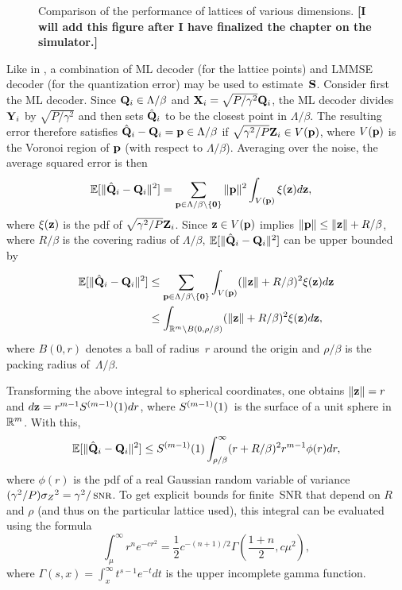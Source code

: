 \begin{figure}
  \begin{center}
  \end{center}
  \caption{Comparison of the performance of lattices of various dimensions.
  \textbf{[I will add this figure after I have finalized the chapter on the
  simulator.]}}
  \label{fig:sim_latticeperf}
\end{figure}

Like in , a combination of ML decoder (for the lattice
points) and LMMSE decoder (for the quantization error) may be used to
estimate~$\S$.  Consider first the ML decoder. Since $\Q_i \in \Lambda/\beta$
and $\X_i = \sqrt{P/\gamma^2} \Q_i$, the ML decoder divides $\Y_i$ by
$\sqrt{P/\gamma^2}$ and then sets $\Qhv_i$ to be the closest point in
$\Lambda/\beta$. The resulting error therefore satisfies $\Qhv_i - \Q_i = \p \in
\Lambda/\beta$ if $\sqrt{\gamma^2/P} \Zv_i \in V(\p)$, where $V(\p)$ is the
Voronoi region of $\p$ (with respect to $\Lambda/\beta$). Averaging over the
noise, the average squared error is then
\begin{align*}
  \mseqiv &= \sum_{\p \in \Lambda/\beta \setminus \{\vz\}} \| \p \|^2
  \int_{V(\p)} \xi(\z) d\z,
\end{align*}
where $\xi(\z)$ is the pdf of $\sqrt{\gamma^2/P} \Zv_i$.
Since $\z \in V(\p)$ implies $\|\p\| \le \|\z\| + R/\beta$, where $R/\beta$ is
the covering radius of $\Lambda/\beta$, $\mseqiv$ can be upper bounded by
\begin{align*}
  \mseqiv &\le \sum_{\p \in \Lambda/\beta \setminus \{\vz\}} \int_{V(\p)}
  (\|\z\| + R/\beta)^2 \xi(\z) d\z \\
  &\le \int_{\R^m \setminus B(0,\rho/\beta)} (\|\z\| + R/\beta)^2 \xi(\z) d\z,
\end{align*}
where $B(0,r)$ denotes a ball of radius~$r$ around the origin and $\rho/\beta$
is the packing radius of~$\Lambda/\beta$. 

Transforming the above integral to spherical coordinates, one obtains $\|\z\| =
r$ and $d\z = r^{m-1} \Sm dr$, where $\Sm$~is the surface of a unit sphere
in~$\R^m$.  With this, 
\begin{equation}
  \label{eq:mseqivbound}
  \mseqiv \le \Sm \int_{\rho/\beta}^\infty (r + R/\beta)^2 r^{m-1} \phi(r) dr,
\end{equation}
where $\phi(r)$ is the pdf of a real Gaussian random variable of variance
$(\gamma^2/P) \szq = \gamma^2/\snr$. To get explicit bounds for finite~SNR that
depend on $R$ and $\rho$ (and thus on the particular lattice used), this
integral can be evaluated using the formula
\begin{equation*}
  \int_\mu^\infty r^n e^{-c r^2} = \frac12 c^{-(n+1)/2} \Gamma\left(
  \frac{1+n}{2}, c \mu^2 \right),
\end{equation*}
where $\Gamma(s, x) = \int_x^\infty t^{s-1} e^{-t} dt$ is the upper incomplete
gamma function.


